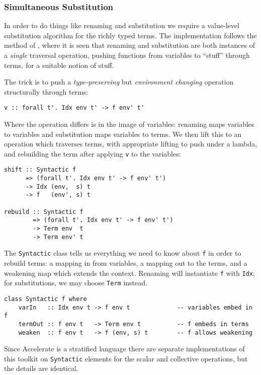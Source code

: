 \subsubsection{Simultaneous Substitution}

In order to do things like renaming
and substitution
we require a value-level substitution algorithm for the richly typed terms. The
implementation follows the method of \citet{McBride:2006,McBride:2005}, where it
is seen that renaming and substitution are both instances of a \emph{single}
traversal operation, pushing functions from variables to ``stuff'' through
terms, for a suitable notion of stuff.

The trick is to push a \emph{type-preserving} but \emph{environment changing}
operation structurally through terms:
%
\begin{lstlisting}[style=haskell]
v :: forall t'. Idx env t' -> f env' t'
\end{lstlisting}
%
Where the operation differs is in the image of variables: renaming maps
variables to variables and substitution maps variables to terms. We then lift
this to an operation which traverses terms, with appropriate lifting to push
under a lambda, and rebuilding the term after applying \texttt{v} to the
variables:
%
\begin{lstlisting}[style=haskell,mathescape=true]
shift :: Syntactic f
      => (forall t'. Idx env t' -> f env' t')
      -> Idx (env,  s) t
      -> f   (env', s) t

rebuild :: Syntactic f
        => (forall t'. Idx env t' -> f env' t')
        -> Term env  t
        -> Term env' t
\end{lstlisting}
%
The \texttt{Syntactic} class tells us everything we need to know about
\texttt{f} in order to rebuild terms: a mapping in from variables, a mapping out
to the terms, and a weakening map which extends the context. Renaming will
instantiate \texttt{f} with \texttt{Idx}; for substitutions, we may choose
\texttt{Term} instead.
%
\begin{lstlisting}[style=haskell]
class Syntactic f where
    varIn   :: Idx env t -> f env t             -- variables embed in f
    termOut :: f env t   -> Term env t          -- f embeds in terms
    weaken  :: f env t   -> f (env, s) t        -- f allows weakening
\end{lstlisting}
%
Since Accelerate is a stratified language there are separate implementations of
this toolkit on \texttt{Syntactic} elements for the scalar and collective
operations, but the details are identical.

